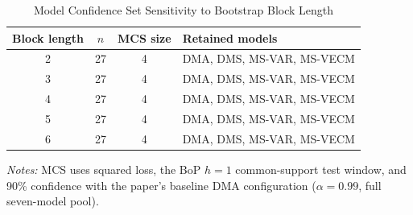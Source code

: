 \begin{table}[htbp]
\centering
\scriptsize
\caption{Model Confidence Set Sensitivity to Bootstrap Block Length}
\label{tab:mcs_block_sensitivity}
\begin{tabular}{cccl}
\toprule
Block length & $n$ & MCS size & Retained models \\
\midrule
2 & 27 & 4 & DMA, DMS, MS-VAR, MS-VECM \\
3 & 27 & 4 & DMA, DMS, MS-VAR, MS-VECM \\
4 & 27 & 4 & DMA, DMS, MS-VAR, MS-VECM \\
5 & 27 & 4 & DMA, DMS, MS-VAR, MS-VECM \\
6 & 27 & 4 & DMA, DMS, MS-VAR, MS-VECM \\
\bottomrule
\end{tabular}
\begin{tablenotes}
\footnotesize
\item \textit{Notes:} MCS uses squared loss, the BoP $h=1$ common-support test window, and 90\% confidence with the paper's baseline DMA configuration ($\alpha=0.99$, full seven-model pool). 
\end{tablenotes}
\end{table}